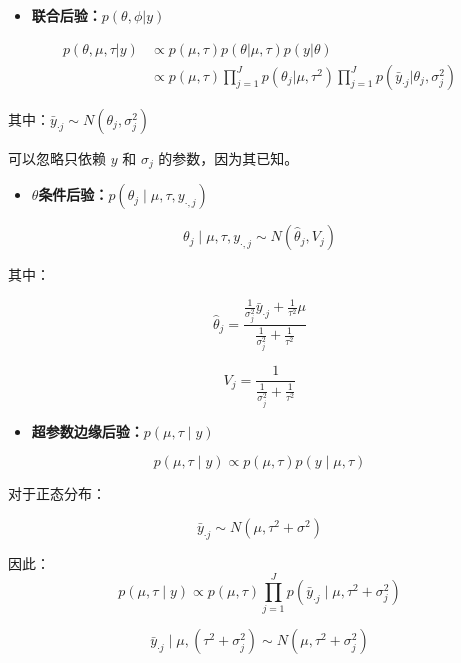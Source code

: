 \begin{enumerate}
\begin{itemize}
\item
  \textbf{联合后验：}\(p(\theta,\phi|y)\)
\end{itemize}

\begin{equation}
  \begin{aligned}
    p(\theta,\mu,\tau|y)
    &\propto p(\mu,\tau)p(\theta|\mu,\tau)p(y|\theta)\\
    &\propto p(\mu,\tau)\prod_{j=1}^{J}p(\theta_j|\mu,\tau^2)
    \prod_{j=1}^{J}p(\bar y _{\cdot j}|\theta_j,\sigma^2_j)
    \end{aligned}
\end{equation}


其中：\(\bar y _{\cdot j}\sim N(\theta_j,\sigma_j^2)\)

可以忽略只依赖 \(y\) 和 \(\sigma_j\) 的参数，因为其已知。

\begin{itemize}
\item
  \textbf{\(\theta\)条件后验：}\(p(\theta_{j} \mid \mu, \tau, y_{\cdot, j})\)
\end{itemize}

\[\theta_{j} \mid \mu, \tau, y_{\cdot, j} \sim N\left(\hat{\theta}_{j}, V_{j}\right)\]

其中：

\[\hat{\theta}_{j}=
\frac
{\frac{1}{\sigma_{j}^{2}} \bar{y}_{\cdot j}+
\frac{1}{\tau^{2}} \mu}
{\frac{1}{\sigma_{j}^{2}}+\frac{1}{\tau^{2}}}\]

\[V_{j}=\frac{1}{\frac{1}{\sigma_{j}^{2}}+\frac{1}{\tau^{2}}}\]

\begin{itemize}
\item
  \textbf{超参数边缘后验：}\(p(\mu, \tau \mid y)\)
\end{itemize}

\[p(\mu, \tau \mid y) \propto p(\mu, \tau) p(y \mid \mu, \tau)\]

对于正态分布：

\[\bar{y}_{\cdot j}\sim N(\mu,\tau^2+\sigma^2)\]

因此：
\begin{equation}
  p(\mu, \tau \mid y) \propto p(\mu, \tau) 
  \prod_{j=1}^{J} p\left(\bar{y} _{\cdot j} \mid \mu, \tau^{2}+\sigma_{j}^{2}\right)
\end{equation}

\begin{equation}
  \bar{y}_{\cdot j} \mid \mu, (\tau^{2}+\sigma_{j}^{2}) 
  \sim
  N \left( \mu, \tau^{2} + \sigma_{j}^{2} \right)
\end{equation}


\end{enumerate}

